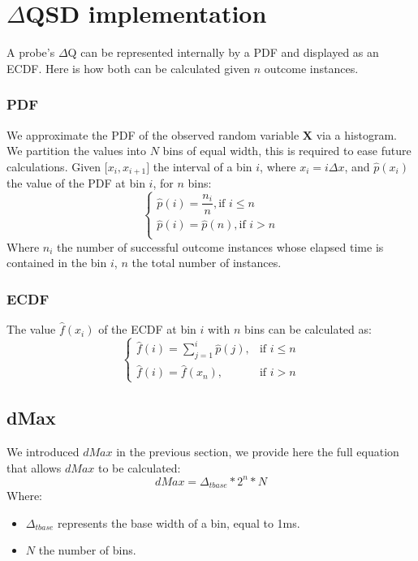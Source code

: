\section{$\Delta$QSD implementation}
    A probe's $\Delta$Q can be represented internally by a PDF and displayed as an ECDF. Here is how both can be calculated given $n$ outcome instances.
    
    \subsubsection{PDF}
  We approximate the PDF of the observed random variable $\textbf{X}$ via a histogram. We partition the values into $N$ bins of equal width, this is required to ease future calculations.
        Given $\lbrack x_i, x_{i+1} \rbrack$ the interval of a bin $i$, where $x_i = i\Delta x$, and $\hat{p}(x_i)$ the value of the PDF at bin $i$, for $n$ bins:
        \begin{equation}
            \begin{cases}
                \hat{p}(i) = \dfrac{n_i}{n}, \text{if } i \le n \\
                \hat{p}(i) = \hat{p}(n), \text{if } i > n \\
            \end{cases}
            \label{eq:pdf}
        \end{equation}
    Where $n_i$ the number of successful outcome instances whose elapsed time is contained in the bin $i$, $n$ the total number of instances.

    \subsubsection{ECDF}
        The value $\hat{f}(x_i)$ of the ECDF at bin $i$ with $n$ bins can be calculated as:
        \begin{equation}
            \begin{cases}
                \hat{f}(i) = \sum_{j=1}^{i} \hat{p}(j), & \text{if } i \le n \\  
                \hat{f}(i) = \hat{f}(x_n), & \text{if } i > n 
            \end{cases}
            \label{eq:cdf}
        \end{equation}

    \subsection{dMax}
        We introduced $dMax$ in the previous section, we provide here the full equation that allows $dMax$ to be calculated:
        \begin{equation}
            dMax = \Delta_{t base} * 2^n * N  
            \label{eq:dMaxU}
        \end{equation}
        Where:
        \begin{itemize}
            \item $\Delta_{t base}$ represents the base width of a bin, equal to 1ms.
            \item $N$ the number of bins.
        \end{itemize}

